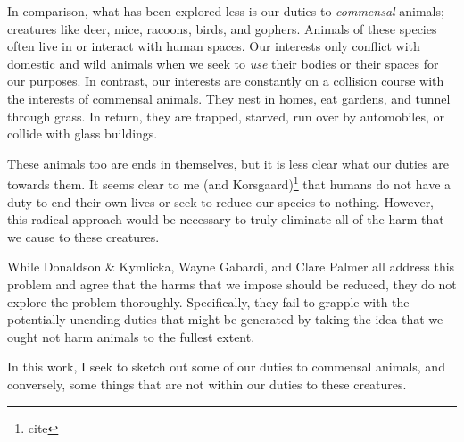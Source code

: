 		In comparison, what has been explored less is our duties to
		\emph{commensal} animals; creatures like deer, mice, racoons, birds,
		and gophers.  Animals of these species often live in or interact with
		human spaces.  Our interests only conflict with domestic and wild
		animals when we seek to \emph{use} their bodies or their spaces for our
		purposes. In contrast, our interests are constantly on a collision
		course with the interests of commensal animals. They nest in homes, eat
		gardens, and tunnel through grass. In return, they are trapped,
		starved, run over by automobiles, or collide with glass buildings.

		These animals too are ends in themselves, but it is less clear what our
		duties are towards them. It seems clear to me (and
		Korsgaard)\footnote{cite} that humans do not have a duty to end their
		own lives or seek to reduce our species to nothing. However, this
		radical approach would be necessary to truly eliminate all of the harm
		that we cause to these creatures.

		While Donaldson \& Kymlicka, Wayne Gabardi, and Clare Palmer all
		address this problem and agree that the harms that we impose should be
		reduced, they do not explore the problem thoroughly.  Specifically,
		they fail to grapple with the potentially unending duties that might be
		generated by taking the idea that we ought not harm animals to the
		fullest extent.

		In this work, I seek to sketch out some of our duties to commensal
		animals, and conversely, some things that are not within our duties to
		these creatures.
